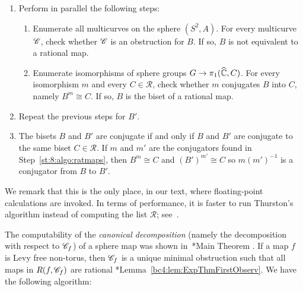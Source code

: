 \documentclass{amsart}
\begin{document}
\begin{algo}
\begin{enumerate}
\begin{enumerate}
      non-\Tor\ maps $g\colon (\hC,C)\selfmap$.
    \end{enumerate}
  \item Perform in parallel the following steps:
    \begin{enumerate}
    \item Enumerate all multicurves on the sphere $(S^2,A)$. For every
      multicurve ${\mathscr C}$, check whether ${\mathscr C}$ is an obstruction for
      $B$. If so, $B$ is not equivalent to a rational map.
      \label{st:7:algo:ratmaps}
    \item Enumerate isomorphisms of sphere groups
      $G\to\pi_1({\widehat{{\mathbb C}}},C)$. For every isomorphism $m$ and every
      $C\in \mathscr R$, check whether $m$ conjugates $B$ into $C$,
      namely $B^m\cong C$. If so, $B$ is the biset of a rational map.
      \label{st:8:algo:ratmaps}
    \end{enumerate}
  \item Repeat the previous steps for $B'$.
  \item The bisets $B$ and $B'$ are conjugate if and only if $B$ and
    $B'$ are conjugate to the same biset $C\in \mathscr R$. If $m$ and
    $m'$ are the conjugators found in Step~\eqref{st:8:algo:ratmaps},
    then $B^m\cong C$ and $(B')^{m'}\cong C$ so $m(m')^{-1}$ is a
    conjugator from $B$ to $B'$.
  \end{enumerate}
\end{algo}
We remark that this is the only place, in our text, where
floating-point calculations are invoked. In terms of performance, it
is faster to run Thurston's algorithm instead of computing the list
$\mathscr R$; see~\cite{bonnot-braverman-yampolsky:thurstondecidable}.

The computability of the \emph{canonical decomposition} (namely the
decomposition with respect to ${\mathscr C}_f$) of a sphere map was shown
in~\cite{selinger-yampolsky:geometrization}*{Main Theorem
  \MakeUppercase{}}. If a map $f$ is Levy free
non-torus, then ${\mathscr C}_f$ is a unique minimal obstruction such that all
maps in $R(f,{\mathscr C}_f)$ are rational
\cite{bartholdi-dudko:bc4}*{Lemma~\ref{bc4:lem:ExpThmFirstObserv}}. We
have the following algorithm:
\end{document}
